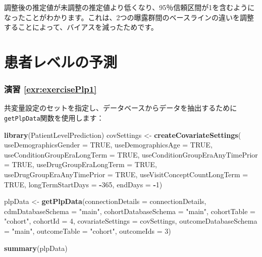 \documentclass[
  11pt]{book}
\newenvironment{Shaded}{\begin{snugshade}}{\end{snugshade}}
\newcommand{\AttributeTok}[1]{\textcolor[rgb]{0.13,0.29,0.53}{#1}}
\newcommand{\ConstantTok}[1]{\textcolor[rgb]{0.56,0.35,0.01}{#1}}
\newcommand{\DecValTok}[1]{\textcolor[rgb]{0.00,0.00,0.81}{#1}}
\newcommand{\FunctionTok}[1]{\textcolor[rgb]{0.13,0.29,0.53}{\textbf{#1}}}
\newcommand{\NormalTok}[1]{#1}
\newcommand{\OtherTok}[1]{\textcolor[rgb]{0.56,0.35,0.01}{#1}}
\newcommand{\SpecialCharTok}[1]{\textcolor[rgb]{0.81,0.36,0.00}{\textbf{#1}}}
\newcommand{\StringTok}[1]{\textcolor[rgb]{0.31,0.60,0.02}{#1}}
\theoremstyle{definition}
\theoremstyle{definition}
\theoremstyle{definition}
\theoremstyle{definition}
\theoremstyle{remark}
\begin{document}
調整後の推定値が未調整の推定値より低くなり、95％信頼区間が1を含むようになったことがわかります。これは、2つの曝露群間のベースラインの違いを調整することによって、バイアスを減ったためです。

\section{患者レベルの予測}\label{Plpanswers}

\subsubsection*{演習 \ref{exr:exercisePlp1}}\label{ux6f14ux7fd2-refexrexerciseplp1}

共変量設定のセットを指定し、データベースからデータを抽出するために\texttt{getPlpData}関数を使用します：

\begin{Shaded}
\begin{Highlighting}[]
\FunctionTok{library}\NormalTok{(PatientLevelPrediction)}
\NormalTok{covSettings }\OtherTok{\textless{}{-}} \FunctionTok{createCovariateSettings}\NormalTok{(}
  \AttributeTok{useDemographicsGender =} \ConstantTok{TRUE}\NormalTok{,}
  \AttributeTok{useDemographicsAge =} \ConstantTok{TRUE}\NormalTok{,}
  \AttributeTok{useConditionGroupEraLongTerm =} \ConstantTok{TRUE}\NormalTok{,}
  \AttributeTok{useConditionGroupEraAnyTimePrior =} \ConstantTok{TRUE}\NormalTok{,}
  \AttributeTok{useDrugGroupEraLongTerm =} \ConstantTok{TRUE}\NormalTok{,}
  \AttributeTok{useDrugGroupEraAnyTimePrior =} \ConstantTok{TRUE}\NormalTok{,}
  \AttributeTok{useVisitConceptCountLongTerm =} \ConstantTok{TRUE}\NormalTok{,}
  \AttributeTok{longTermStartDays =} \SpecialCharTok{{-}}\DecValTok{365}\NormalTok{,}
  \AttributeTok{endDays =} \SpecialCharTok{{-}}\DecValTok{1}\NormalTok{)}

\NormalTok{plpData }\OtherTok{\textless{}{-}} \FunctionTok{getPlpData}\NormalTok{(}\AttributeTok{connectionDetails =}\NormalTok{ connectionDetails,}
                      \AttributeTok{cdmDatabaseSchema =} \StringTok{"main"}\NormalTok{,}
                      \AttributeTok{cohortDatabaseSchema =} \StringTok{"main"}\NormalTok{,}
                      \AttributeTok{cohortTable =} \StringTok{"cohort"}\NormalTok{,}
                      \AttributeTok{cohortId =} \DecValTok{4}\NormalTok{,}
                      \AttributeTok{covariateSettings =}\NormalTok{ covSettings,}
                      \AttributeTok{outcomeDatabaseSchema =} \StringTok{"main"}\NormalTok{,}
                      \AttributeTok{outcomeTable =} \StringTok{"cohort"}\NormalTok{,}
                      \AttributeTok{outcomeIds =} \DecValTok{3}\NormalTok{)}

\FunctionTok{summary}\NormalTok{(plpData)}
\end{Highlighting}
\end{Shaded}
\end{document}
